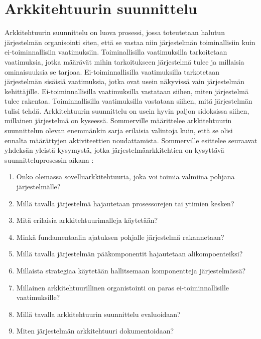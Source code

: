 \documentclass[utf8]{gradu3}
\begin{document}
\section{Arkkitehtuurin suunnittelu}

Arkkitehtuurin suunnittelu on luova prosessi, jossa toteutetaan halutun järjestelmän organisointi siten, että se vastaa niin järjestelmän toiminallisiin kuin ei-toiminnallisiin vaatimuksiin. Toiminallisilla vaatimuksilla tarkoitetaan vaatimuksia, jotka määrävät mihin tarkoitukseen järjestelmä tulee ja millaisia ominaisuuksia se tarjoaa. Ei-toiminnallisilla vaatimuksilla tarkotetaan järjestelmän sisäisiä vaatimuksia, jotka ovat usein näkyvissä vain järjestelmän kehittäjille. Ei-toiminnallisilla vaatimuksilla vastataan siihen, miten järjestelmä tulee rakentaa. Toiminnallisilla vaatimuksilla vastataan siihen, mitä järjestelmän tulisi tehdä.  Arkkitehtuurin suunnittelu on usein hyvin paljon sidoksissa siihen, millainen järjestelmä on kyseessä. Sommerville määrittelee arkkitehtuurin suunnittelun olevan enemmänkin sarja erilaisia valintoja kuin, että se olisi ennalta määrättyjen aktiviteettien noudattamista. Sommerville esittelee seuraavat yhdeksän yleistä kysymystä, jotka järjestelmäarkkitehtien on kysyttävä suunnitteluprosessin aíkana \parencite[s. 151]{Sommerville}:

\begin{enumerate}  
\item Onko olemassa sovelluarkkitehtuuria, joka voi toimia valmiina pohjana järjestelmälle?
\item Millä tavalla järjestelmä hajautetaan prosessorejen tai ytimien kesken?
\item Mitä erilaisia arkkitehtuurimalleja käytetään?
\item Minkä fundamentaalin ajatuksen pohjalle järjestelmä rakannetaan?
\item Millä tavalla järjestelmän pääkomponentit hajautetaan alikompoenteiksi?
\item Millaista strategiaa käytetään hallitsemaan komponentteja järjestelmässä?
\item Millainen arkkitehtuurillinen organistointi on paras ei-toiminnallisille vaatimuksille?
\item Millä tavalla arkkitehtuurin suunnittelu evaluoidaan?
\item Miten järjestelmän arkkitehtuuri dokumentoidaan?
\end{enumerate}
\end{document}
